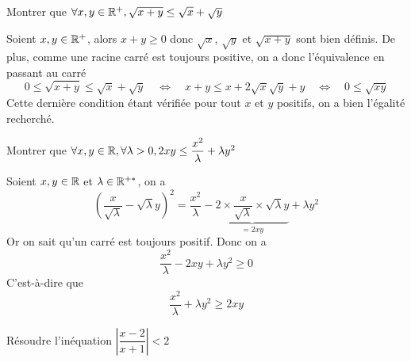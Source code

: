 \documentclass{fancybook}
\begin{document}
\begin{exercice}
Montrer que $\forall x,y\in\mathbb{R}^+,\sqrt{x+y}\le\sqrt{x}+\sqrt{y}$
\end{exercice}

\begin{solution}
Soient $x, y \in \mathbb{R}^+$, alors $x+y \ge 0$ donc $\sqrt{x}$, $\sqrt{y}$ et $\sqrt{x+y}$ sont bien définis. De plus, comme une racine carré est toujours positive, on a donc l'équivalence en passant au carré
\[
0\le\sqrt{x+y}\le\sqrt{x}+\sqrt{y}
\quad\Leftrightarrow\quad
x + y \le x + 2 \sqrt{x}\sqrt{y} + y 
\quad\Leftrightarrow\quad
0 \le \sqrt{xy}
\] 
Cette dernière condition étant vérifiée pour tout $x$ et $y$ positifs, on a bien l'égalité recherché.
\end{solution}

\begin{exercice}
Montrer que $\forall x,y\in\mathbb{R}, \forall\lambda>0, 2xy\le\dfrac{x^2}{\lambda}+\lambda y^2$
\end{exercice}

\begin{solution}
Soient $x, y \in \mathbb{R}$ et $\lambda \in \mathbb{R}^{+*}$, on a \[
\left(\dfrac{x}{\sqrt{\lambda}} - \sqrt{\lambda} y\right)^2 = \dfrac{x^2}{\lambda} - \underbrace{2 \times \dfrac{x}{\sqrt{\lambda}}\times \sqrt{\lambda} y}_{=2xy} +\lambda y^2
\]
Or on sait qu'un carré est toujours positif. Donc on a
\[
\dfrac{x^2}{\lambda} - 2xy +\lambda y^2 \ge 0
\]
C'est-à-dire que
\[
\dfrac{x^2}{\lambda} +\lambda y^2 \ge 2xy
\]
\end{solution}

\begin{exercice}
Résoudre l'inéquation $\left|\dfrac{x-2}{x+1}\right|<2$
\end{exercice}
\end{document}
